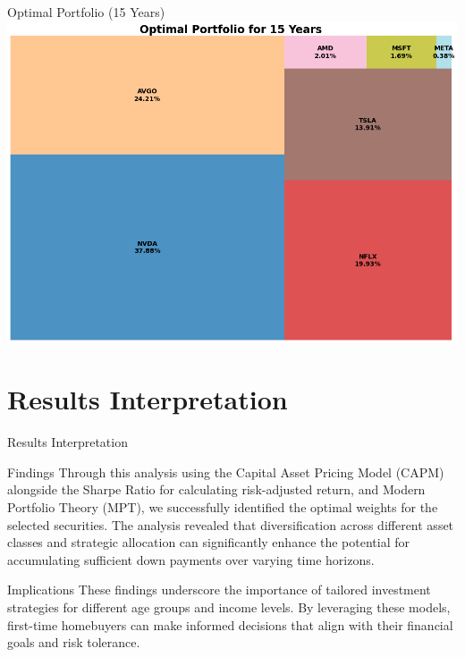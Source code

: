 \documentclass{beamer}
\begin{document}
\begin{frame}{Optimal Portfolio (15 Years)}
    \centering
    \includegraphics[height=0.8\textheight]{optimal_portfolio_15_years.png}
\end{frame}


\section{Results Interpretation}
\begin{frame}{Results Interpretation}
    \begin{block}{Findings}
        Through this analysis using the Capital Asset Pricing Model (CAPM) alongside the Sharpe Ratio for calculating risk-adjusted return, and Modern Portfolio Theory (MPT), we successfully identified the optimal weights for the selected securities. The analysis revealed that diversification across different asset classes and strategic allocation can significantly enhance the potential for accumulating sufficient down payments over varying time horizons.
    \end{block}
    \begin{block}{Implications}
        These findings underscore the importance of tailored investment strategies for different age groups and income levels. By leveraging these models, first-time homebuyers can make informed decisions that align with their financial goals and risk tolerance.
    \end{block}
\end{frame}
\end{document}
